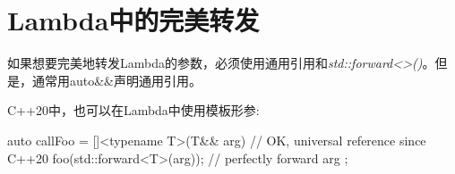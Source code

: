 \section{Lambda中的完美转发}
如果想要完美地转发Lambda的参数，必须使用通用引用和\textit{std::forward<>()}。但是，通常用auto\&\&声明通用引用。

C++20中，也可以在Lambda中使用模板形参:

\begin{cppcode}
auto callFoo = []<typename T>(T&& arg) { // OK, universal reference since C++20
	foo(std::forward<T>(arg)); // perfectly forward arg
};
\end{cppcode}

